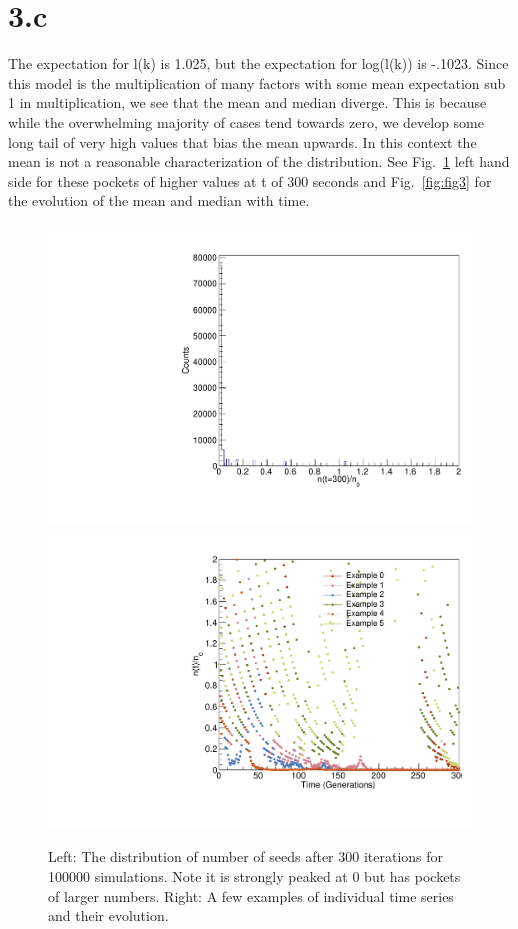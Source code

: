 \documentclass{article}
\begin{document}
\section{3.c}

The expectation for l(k) is 1.025, but the expectation for log(l(k)) is -.1023. Since this model is the multiplication of many factors with some mean expectation sub 1 in multiplication, we see that the mean and median diverge. This is because while the overwhelming majority of cases tend towards zero, we develop some long tail of very high values that bias the mean upwards. In this context the mean is not a reasonable characterization of the distribution. See Fig.~\ref{fig:fig2} left hand side for these pockets of higher values at t of 300 seconds and Fig.~\ref{fig:fig3} for the evolution of the mean and median with time.

\begin{figure}[H]
    \centering
    \includegraphics[width=.45\textwidth]{betHedge300Hist.pdf} 
    \includegraphics[width=.45\textwidth]{timeSeriesBetHedge.pdf} 
    \caption{Left: The distribution of number of seeds after 300 iterations for 100000 simulations. Note it is strongly peaked at 0 but has pockets of larger numbers. Right: A few examples of individual time series and their evolution.}
    \label{fig:fig2}
\end{figure}
\end{document}
